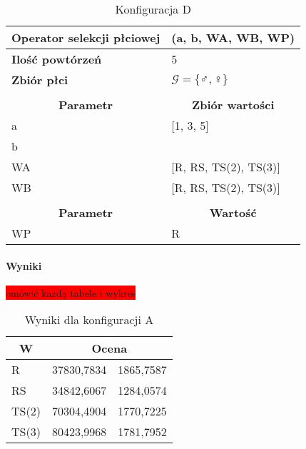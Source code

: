 \documentclass[twoside]{iisthesis}
\newcommand{\todo}{\colorbox{red}}
\newcommand{\important}[1]{\mathcal{#1}}
\newcommand{\opName}[1]{\textproc{#1}}
\begin{document}
\begin{table}[h]
	\caption{Konfiguracja D \label{table:tsp_config_compare_d}}
	\begin{tabularx}{\linewidth}{lX}
		\hline
		\multicolumn{1}{|l|}{{\bf Operator selekcji płciowej}}        & \multicolumn{1}{l|}{\opName{harem}(a, b, WA, WB, WP)} \\ \hline
		\multicolumn{1}{|l|}{{\bf Ilość powtórzeń}} & \multicolumn{1}{l|}{5}                                  \\ \hline
		\multicolumn{1}{|l|}{{\bf Zbiór płci}} & \multicolumn{1}{l|}{$\important{G} = \{ \male, \female \}$} \\ \hline
		&                                                         \\ \hline
		\multicolumn{1}{|c|}{{\bf Parametr}}        & \multicolumn{1}{c|}{{\bf Zbiór wartości}}               \\ \hline \hline
		\multicolumn{1}{|l|}{a}                     & \multicolumn{1}{l|}{{[}1, 3, 5{]}}                      \\ \hline
		\multicolumn{1}{|l|}{b}                     & \multicolumn{1}{l|}{}                                   \\ \hline
		\multicolumn{1}{|l|}{WA}                    & \multicolumn{1}{l|}{[R, RS, TS(2), TS(3)]}          \\ \hline
		\multicolumn{1}{|l|}{WB}                    & \multicolumn{1}{l|}{[R, RS, TS(2), TS(3)]}          \\ \hline
		&                                                         \\ \hline
		\multicolumn{1}{|c|}{{\bf Parametr}}        & \multicolumn{1}{c|}{{\bf Wartość}}                      \\ \hline \hline
		\multicolumn{1}{|l|}{WP}                    & \multicolumn{1}{l|}{R}                                  \\ \hline
	\end{tabularx}
\end{table}

\paragraph{Wyniki}
\todo{omówić każdą tabele i wykres}


\begin{table}[h]
	\caption{Wyniki dla konfiguracji A \label{table:tsp_results_compare_a}}
	\centering
	\begin{tabular}{|l|r@{$\pm$}l|}
		\hline
		\multicolumn{1}{|c|}{{\bf W}} & \multicolumn{2}{c|}{{\bf Ocena}} \\ \hline \hline
		R                             & 37830,7834      & 1865,7587      \\ \hline
		RS                            & 34842,6067      & 1284,0574      \\ \hline
		TS(2)                         & 70304,4904      & 1770,7225      \\ \hline
		TS(3)                         & 80423,9968      & 1781,7952      \\ \hline
	\end{tabular}
\end{table}
\end{document}

